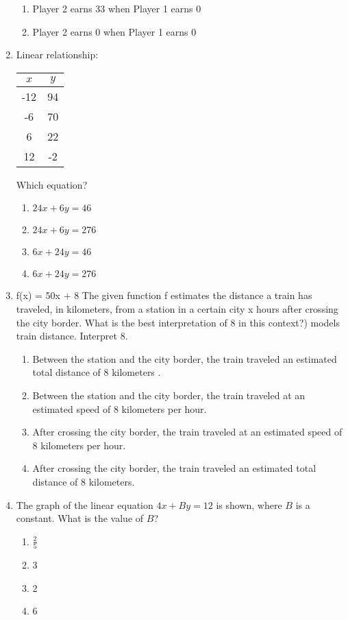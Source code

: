 \documentclass[12pt]{exam}
\begin{document}
\begin{enumerate}
\begin{enumerate}[label=\Alph*)]
        \item Player 2 earns 33 when Player 1 earns 0
        \item Player 2 earns 0 when Player 1 earns 0
    \end{enumerate}
    \item Linear relationship:
    \begin{center}
        \begin{tabular}{|c|c|}
            \hline
            $x$ & $y$ \\
            \hline
            -12 & 94 \\
            -6 & 70 \\
            6 & 22 \\
            12 & -2 \\
            \hline
        \end{tabular}
    \end{center}
    Which equation?
    \begin{enumerate}[label=\Alph*)]
        \item $24x + 6y = 46$
        \item $24x + 6y = 276$
        \item $6x + 24y = 46$
        \item $6x + 24y = 276$
    \end{enumerate}
    \item f(x) = 50x + 8
The given function f estimates the distance
a train has traveled, in kilometers, from a
station in a certain city x hours after crossing the city border. What is the best interpretation of 8 in this context?) models train distance. Interpret 8.
    \begin{enumerate}[label=\Alph*)]
        \item Between the station and the city border, the train traveled an estimated total distance of 8 kilometers  .
        \item Between the station and the city border, the train traveled at an estimated speed of 8 kilometers per hour.
        \item After crossing the city border, the train traveled at an estimated speed of 8 kilometers per hour.
        \item After crossing the city border, the train traveled an estimated total distance of 8 kilometers.
    \end{enumerate}
    \item The graph of the linear equation $4x + By = 12$ is shown, where $B$ is a constant. What is the value of $B$?
\begin{enumerate}[label=\Alph*)]
    \item $\frac{2}{5}$
    \item 3
    \item 2
    \item 6
\end{enumerate}


\end{enumerate}
\end{document}
